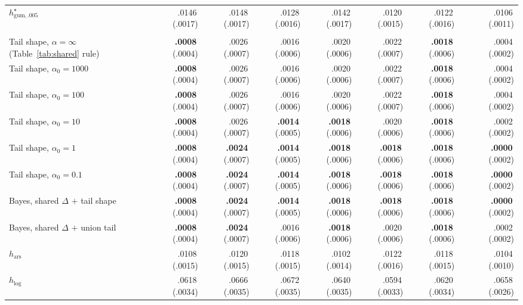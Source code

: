 \documentclass[11pt]{article}
\newcommand{\mcse}[2]{\mbox{#1\,{\fontsize{7}{8}\selectfont(#2)}}}
\newcommand{\bestmcse}[2]{\mbox{\textbf{#1}\,{\fontsize{7}{8}\selectfont(#2)}}}
\begin{document}
\begin{table}[p]
\begin{tabular}{@{}lrrrrrrcr@{}}
$h^\star_{\mathrm{gum},.005}$ & \mcse{.0146}{.0017} & \mcse{.0148}{.0017} & \mcse{.0128}{.0016} & \mcse{.0142}{.0017} & \mcse{.0120}{.0015} & \mcse{.0122}{.0016} & & \mcse{.0106}{.0011} \\
\addlinespace[1pt]
\multicolumn{9}{@{}l}{\textit{Horizon $n=700$}}\\
Tail shape, $\alpha=\infty$ (Table~\ref{tab:shared} rule) & \bestmcse{.0008}{.0004} & \mcse{.0026}{.0007} & \mcse{.0016}{.0006} & \mcse{.0020}{.0006} & \mcse{.0022}{.0007} & \bestmcse{.0018}{.0006} & & \mcse{.0004}{.0002} \\
Tail shape, $\alpha_0=1000$ & \bestmcse{.0008}{.0004} & \mcse{.0026}{.0007} & \mcse{.0016}{.0006} & \mcse{.0020}{.0006} & \mcse{.0022}{.0007} & \bestmcse{.0018}{.0006} & & \mcse{.0004}{.0002} \\
Tail shape, $\alpha_0=100$ & \bestmcse{.0008}{.0004} & \mcse{.0026}{.0007} & \mcse{.0016}{.0006} & \mcse{.0020}{.0006} & \mcse{.0022}{.0007} & \bestmcse{.0018}{.0006} & & \mcse{.0004}{.0002} \\
Tail shape, $\alpha_0=10$ & \bestmcse{.0008}{.0004} & \mcse{.0026}{.0007} & \bestmcse{.0014}{.0005} & \bestmcse{.0018}{.0006} & \mcse{.0020}{.0006} & \bestmcse{.0018}{.0006} & & \mcse{.0002}{.0002} \\
Tail shape, $\alpha_0=1$ & \bestmcse{.0008}{.0004} & \bestmcse{.0024}{.0007} & \bestmcse{.0014}{.0005} & \bestmcse{.0018}{.0006} & \bestmcse{.0018}{.0006} & \bestmcse{.0018}{.0006} & & \bestmcse{.0000}{.0002} \\
Tail shape, $\alpha_0=0.1$ & \bestmcse{.0008}{.0004} & \bestmcse{.0024}{.0007} & \bestmcse{.0014}{.0005} & \bestmcse{.0018}{.0006} & \bestmcse{.0018}{.0006} & \bestmcse{.0018}{.0006} & & \bestmcse{.0000}{.0002} \\
Bayes, shared $\Delta$ $+$ tail shape & \bestmcse{.0008}{.0004} & \bestmcse{.0024}{.0007} & \bestmcse{.0014}{.0005} & \bestmcse{.0018}{.0006} & \bestmcse{.0018}{.0006} & \bestmcse{.0018}{.0006} & & \bestmcse{.0000}{.0002} \\
Bayes, shared $\Delta$ $+$ union tail & \bestmcse{.0008}{.0004} & \bestmcse{.0024}{.0007} & \mcse{.0016}{.0006} & \bestmcse{.0018}{.0006} & \mcse{.0020}{.0006} & \bestmcse{.0018}{.0006} & & \mcse{.0002}{.0002} \\
\addlinespace[1pt]
$h_{\mathrm{ars}}$ & \mcse{.0108}{.0015} & \mcse{.0120}{.0015} & \mcse{.0118}{.0015} & \mcse{.0102}{.0014} & \mcse{.0122}{.0016} & \mcse{.0118}{.0015} & & \mcse{.0104}{.0010} \\
$h_{\log}$ & \mcse{.0618}{.0034} & \mcse{.0666}{.0035} & \mcse{.0672}{.0035} & \mcse{.0640}{.0035} & \mcse{.0594}{.0033} & \mcse{.0620}{.0034} & & \mcse{.0658}{.0026} \\

\end{tabular}
\end{table}
\end{document}
